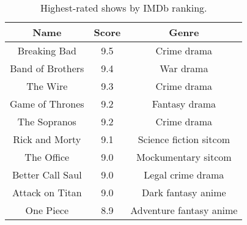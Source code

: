 \begin{table}[htbp]
    \centering
    
    \begin{tabular}{|c|c|c|}
        \hline
        Name & Score & Genre \\
        \hline \hline
        Breaking Bad & 9.5 & Crime drama \\
        \hline
        Band of Brothers & 9.4 & War drama \\
        \hline
        The Wire & 9.3 & Crime drama \\
        \hline
        Game of Thrones & 9.2 & Fantasy drama \\
        \hline
        The Sopranos & 9.2 & Crime drama \\
        \hline
        Rick and Morty & 9.1 & Science fiction sitcom \\
        \hline
        The Office & 9.0 & Mockumentary sitcom \\
        \hline
        Better Call Saul & 9.0 & Legal crime drama \\
        \hline
        Attack on Titan & 9.0 & Dark fantasy anime \\
        \hline
        One Piece & 8.9 & Adventure fantasy anime\\
        \hline
    \end{tabular}
    \caption{Highest-rated shows by IMDb ranking.}
    \label{tab:IMDb}
\end{table}